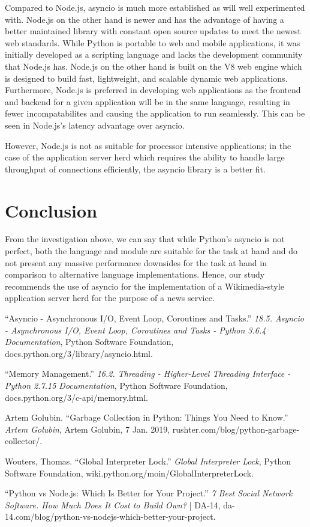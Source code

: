 Compared to Node.js, asyncio is much more established as will well experimented with. Node.js on the other hand is newer and has the advantage of having a better maintained library with constant open source updates to meet the newest web standards. While Python is portable to web and mobile applications, it was initially developed as a scripting language and lacks the development community that Node.js has. Node.js on the other hand is built on the V8 web engine which is designed to build fast, lightweight, and scalable dynamic web applications. Furthermore, Node.js is preferred in developing web applications as the frontend and backend for a given application will be in the same language, resulting in fewer incompatabilites and causing the application to run seamlessly. This can be seen in Node.js's latency advantage over asyncio.

However, Node.js is not as suitable for processor intensive applications; in the case of the application server herd which requires the ability to handle large throughput of connections efficiently, the asyncio library is a better fit.

\section{Conclusion}

From the investigation above, we can say that while Python's asyncio is not perfect, both the language and module are suitable for the task at hand and do not present any massive performance downsides for the task at hand in comparison to alternative language implementations. Hence, our study recommends the use of asyncio for the implementation of a Wikimedia-style application server herd for the purpose of a news service.

\begin{thebibliography}{9}
\bibitem{} 
“Asyncio - Asynchronous I/O, Event Loop,
Coroutines and Tasks.” \textit{18.5. Asyncio -
Asynchronous I/O, Event Loop, Coroutines and Tasks
- Python 3.6.4 Documentation}, Python Software
Foundation,
docs.python.org/3/library/asyncio.html.
 
\bibitem{} 
“Memory Management.” \textit{16.2. Threading - Higher-Level Threading Interface - Python 2.7.15 Documentation}, Python Software Foundation, docs.python.org/3/c-api/memory.html.
 
\bibitem{} 
Artem Golubin. “Garbage Collection in Python: Things You Need to Know.” \textit{Artem Golubin}, Artem Golubin, 7 Jan. 2019, rushter.com/blog/python-garbage-collector/.

\bibitem{}
Wouters, Thomas. “Global Interpreter Lock.” \textit{Global Interpreter Lock}, Python Software Foundation, wiki.python.org/moin/GlobalInterpreterLock. 

\bibitem{}
“Python vs Node.js: Which Is Better for Your Project.” \textit{7 Best Social Network Software. How Much Does It Cost to Build Own?} | DA-14, da-14.com/blog/python-vs-nodejs-which-better-your-project. \\
\end{thebibliography}

